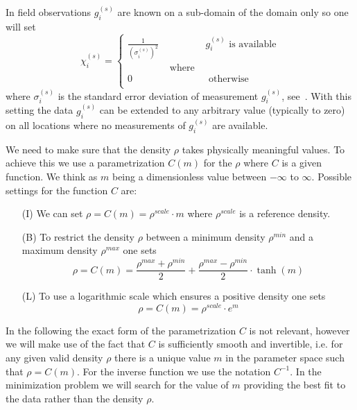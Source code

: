 In field observations  $g^{(s)}_i$
are known on a sub-domain of the domain only so one will set
\begin{equation}\label{GRAV:EQU:105}
\chi^{(s)}_i 
= \left\{
\begin{array}{lcl}
\frac{1}{(\sigma^{(s)}_i)^2} & & g^{(s)}_i \mbox{ is available} \\
& \mbox{ where } & \\
0 & & \mbox{ otherwise } \\
\end{array}
\right.
\end{equation} 
where $\sigma^{(s)}_i$ is the standard error deviation of measurement $g^{(s)}_i$, see~\cite{A}.
With this setting the data $g^{(s)}_i$ can be extended to any arbitrary value (typically to zero) on
all locations where no measurements of $g^{(s)}_i$ are available.  

We need to make sure that the density $\rho$ takes physically meaningful values. 
To achieve this we use a parametrization $C(m)$ for the $\rho$ where $C$ is a given function. We think as 
$m$ being a dimensionless value between $-\infty$ to $\infty$. Possible settings for the function $C$ are:
\begin{itemize}
 \item[(I)] We can set $\rho = C(m)= \rho^{scale} \cdot m$ where $\rho^{scale}$ is a reference density.
 \item[(B)] To restrict the density $\rho$ between 
a minimum density $\rho^{min}$ and a maximum density $\rho^{max}$ one sets 
\begin{equation} 
\rho = C(m) = \frac{\rho^{max} +\rho^{min}}{2} + \frac{\rho^{max} -\rho^{min}}{2} \cdot \tanh(m)
\end{equation} 
 \item[(L)] To use a logarithmic scale which ensures a positive density one sets
\begin{equation} 
\rho = C(m) = \rho^{scale} \cdot e^{m}
\end{equation} 
\end{itemize}
In the following the exact form of the parametrization $C$ is not relevant, however we will make use of the 
fact that $C$ is sufficiently smooth and invertible, i.e. for any given valid density $\rho$ there is a unique
 value $m$ in the parameter space such that $\rho=C(m)$. For the inverse function we use the notation $C^{-1}$.
In the minimization problem we will search for the value of $m$ providing the best fit to the data 
rather than the density $\rho$. 


